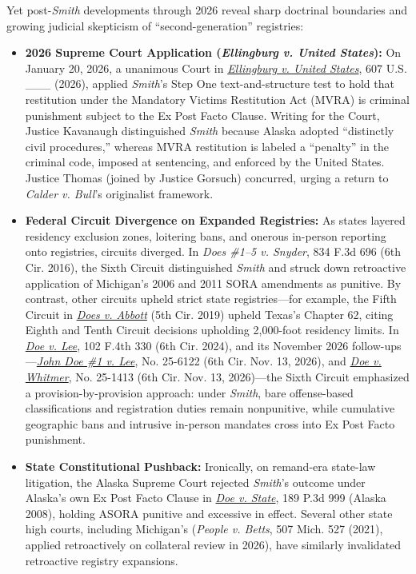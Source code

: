 \documentclass[12pt]{article}
\begin{document}
Yet post-\textit{Smith} developments through 2026 reveal sharp doctrinal boundaries and growing judicial skepticism of ``second-generation'' registries:
\begin{itemize}
  \item \textbf{2026 Supreme Court Application (\textit{Ellingburg v. United States}):} On January 20, 2026, a unanimous Court in \href{https://www.law.cornell.edu/supremecourt/text/24-482}{\textit{Ellingburg v. United States}}, 607 U.S. \_\_\_ (2026), applied \textit{Smith}'s Step One text-and-structure test to hold that restitution under the Mandatory Victims Restitution Act (MVRA) is criminal punishment subject to the Ex Post Facto Clause. Writing for the Court, Justice Kavanaugh distinguished \textit{Smith} because Alaska adopted ``distinctly civil procedures,'' whereas MVRA restitution is labeled a ``penalty'' in the criminal code, imposed at sentencing, and enforced by the United States. Justice Thomas (joined by Justice Gorsuch) concurred, urging a return to \textit{Calder v. Bull}'s originalist framework.
  \item \textbf{Federal Circuit Divergence on Expanded Registries:} As states layered residency exclusion zones, loitering bans, and onerous in-person reporting onto registries, circuits diverged. In \textit{Does \#1--5 v. Snyder}, 834 F.3d 696 (6th Cir. 2016), the Sixth Circuit distinguished \textit{Smith} and struck down retroactive application of Michigan's 2006 and 2011 SORA amendments as punitive. By contrast, other circuits upheld strict state registries---for example, the Fifth Circuit in \href{https://caselaw.findlaw.com/court/us-5th-circuit/2036050.html}{\textit{Does v. Abbott}} (5th Cir. 2019) upheld Texas's Chapter 62, citing Eighth and Tenth Circuit decisions upholding 2,000-foot residency limits. In \href{https://law.justia.com/cases/federal/appellate-courts/ca6/23-5248/23-5248-2024-05-15.html}{\textit{Doe v. Lee}}, 102 F.4th 330 (6th Cir. 2024), and its November 2026 follow-ups---\href{https://law.justia.com/cases/federal/appellate-courts/ca6/25-6122/25-6122-2026-11-13.html}{\textit{John Doe \#1 v. Lee}}, No. 25-6122 (6th Cir. Nov. 13, 2026), and \href{https://law.justia.com/cases/federal/appellate-courts/ca6/25-1413/25-1413-2026-11-13.html}{\textit{Doe v. Whitmer}}, No. 25-1413 (6th Cir. Nov. 13, 2026)---the Sixth Circuit emphasized a provision-by-provision approach: under \textit{Smith}, bare offense-based classifications and registration duties remain nonpunitive, while cumulative geographic bans and intrusive in-person mandates cross into Ex Post Facto punishment.
  \item \textbf{State Constitutional Pushback:} Ironically, on remand-era state-law litigation, the Alaska Supreme Court rejected \textit{Smith}'s outcome under Alaska's own Ex Post Facto Clause in \href{https://law.justia.com/cases/alaska/supreme-court/2008/189-p3d-999.html}{\textit{Doe v. State}}, 189 P.3d 999 (Alaska 2008), holding ASORA punitive and excessive in effect. Several other state high courts, including Michigan's (\textit{People v. Betts}, 507 Mich. 527 (2021), applied retroactively on collateral review in 2026), have similarly invalidated retroactive registry expansions.
\end{itemize}
\end{document}
